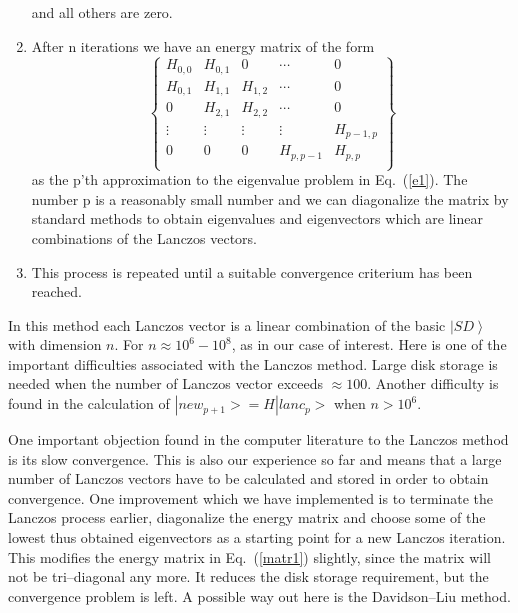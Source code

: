 \documentclass[twoside,12pt]{article}
\newcommand{\be}{\begin{equation}}
\newcommand{\ee}{\end{equation}}
\newcommand{\ket}[1]{\left| #1 \right\rangle}
\begin{document}
\begin{enumerate}
%
and all others are zero.
%
\item After n iterations we have an energy matrix of the form
%
\be
\left \{
\begin{array}{ccccc}
H_{0,0} & H_{0,1} & 0       & \cdots   & 0  \\
H_{0,1} & H_{1,1} & H_{1,2} & \cdots   & 0  \\
0       & H_{2,1} & H_{2,2} & \cdots   & 0  \\
\vdots  & \vdots  & \vdots  & \vdots   & H_{p-1,p}  \\
0       & 0       & 0       & H_{p,p-1}   & H_{p,p}\\
\end{array}
\right \}
\label{matr1}
\ee
as the p'th approximation to the eigenvalue problem in Eq.~(\ref{e1}).
The number p is a reasonably small number and we can diagonalize
the matrix by standard methods to obtain eigenvalues and eigenvectors
which are linear combinations of the Lanczos vectors.
%
\item This process is repeated until a suitable convergence
criterium has been reached.
%
\end{enumerate}
%
In this method each Lanczos vector is a linear combination
of the basic $\ket{SD}$ with dimension $n$. For
$n \approx 10^6-10^8$, as in our case of interest.
Here is  one of the important difficulties associated
with the Lanczos method. Large disk storage is needed when
the number of Lanczos vector exceeds $\approx 100$.
Another difficulty is found in the calculation of
$|new_{p+1}> = H |lanc_p>$ when $n > 10^6$.

One important objection found in the computer literature \cite{dav89}
to the Lanczos method is its slow convergence. This
is also our experience so far and means
that a large number of Lanczos vectors have to be calculated
and stored in order to obtain convergence.
One improvement which we have implemented is to
terminate the Lanczos process earlier, diagonalize the energy
matrix and choose some
of the lowest thus obtained eigenvectors as a starting point
for a new Lanczos iteration.
This modifies the energy matrix in Eq.~(\ref{matr1}) slightly,
since the matrix will not be tri--diagonal any more.
It reduces the disk storage requirement, but the convergence
problem is left. A possible way out here is the Davidson--Liu
method.
%
\end{document}
